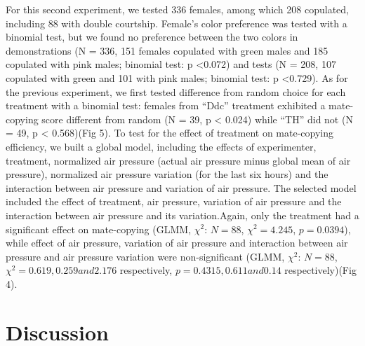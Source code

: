 \documentclass[a4paper, 12pt]{article}
\begin{document}
For this second experiment, we tested 336 females, among which 208 copulated, including 88 with double courtship. Female's color preference was tested with a binomial test, but we found no preference between the two colors in demonstrations (N = 336, 151 females copulated with green males and 185 copulated with pink males; binomial test: p {\textless}0.072) and tests (N = 208, 107 copulated with green and 101 with pink males; binomial test: p {\textless}0.729).
As for the previous experiment, we first tested difference from random choice for each treatment with a binomial test: females from ``Ddc'' treatment exhibited a mate-copying score different from random (N = 39, p {\textless} 0.024) while ``TH'' did not (N = 49, p {\textless} 0.568)(Fig 5).
To test for the effect of treatment on mate-copying efficiency, we built a global model, including the effects of experimenter, treatment, normalized air pressure (actual air pressure minus global mean of air pressure), normalized air pressure variation (for the last six hours) and the interaction between air pressure and variation of air pressure. The selected model included the effect of treatment, air pressure, variation of air pressure and the interaction between air pressure and its variation.Again, only the treatment had a significant effect on mate-copying (GLMM, $\chi^2$: $N = 88$, $\chi^2 = 4.245$, $p = 0.0394$), while effect of air pressure, variation of air pressure and interaction between air pressure and air pressure variation were non-significant (GLMM, $\chi^2$: $N = 88$, $\chi^2 = 0.619, 0.259 and 2.176$ respectively, $p = 0.4315, 0.611 and 0.14$ respectively)(Fig 4).


\section{Discussion}
\end{document}
